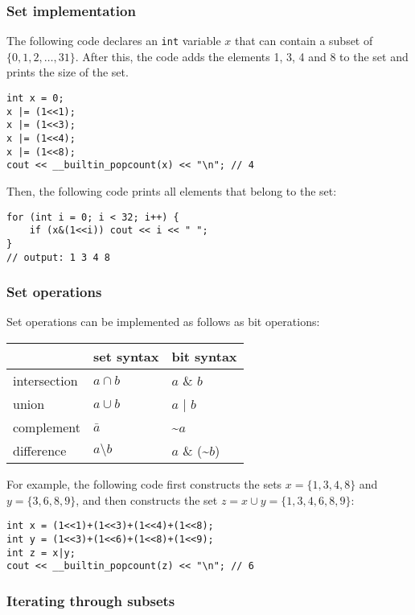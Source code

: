 \subsubsection{Set implementation}

The following code declares an \texttt{int}
variable $x$ that can contain
a subset of $\{0,1,2,\ldots,31\}$.
After this, the code adds the elements 1, 3, 4 and 8
to the set and prints the size of the set.
\begin{lstlisting}
int x = 0;
x |= (1<<1);
x |= (1<<3);
x |= (1<<4);
x |= (1<<8);
cout << __builtin_popcount(x) << "\n"; // 4
\end{lstlisting}
Then, the following code prints all
elements that belong to the set:
\begin{lstlisting}
for (int i = 0; i < 32; i++) {
    if (x&(1<<i)) cout << i << " ";
}
// output: 1 3 4 8
\end{lstlisting}

\subsubsection{Set operations}

Set operations can be implemented as follows as bit operations:

\begin{center}
\begin{tabular}{lll}
& set syntax & bit syntax \\
\hline
intersection & $a \cap b$ & $a$ \& $b$ \\
union & $a \cup b$ & $a$ | $b$ \\
complement & $\bar a$ & \textasciitilde$a$ \\
difference & $a \setminus b$ & $a$ \& (\textasciitilde$b$) \\
\end{tabular}
\end{center}

For example, the following code first constructs
the sets $x=\{1,3,4,8\}$ and $y=\{3,6,8,9\}$,
and then constructs the set $z = x \cup y = \{1,3,4,6,8,9\}$:

\begin{lstlisting}
int x = (1<<1)+(1<<3)+(1<<4)+(1<<8);
int y = (1<<3)+(1<<6)+(1<<8)+(1<<9);
int z = x|y;
cout << __builtin_popcount(z) << "\n"; // 6
\end{lstlisting}

\subsubsection{Iterating through subsets}

